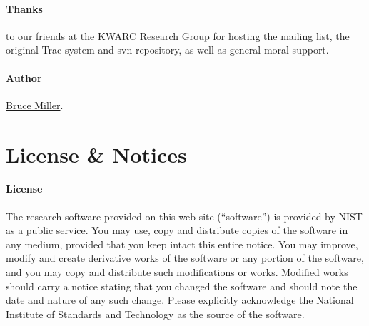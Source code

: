 \documentclass{article}
\begin{document}


\paragraph{Thanks} to our friends at
the \href{http://kwarc.info}{KWARC Research Group}
for hosting the mailing list, the original Trac system and svn repository,
as well as general moral support.


\paragraph{Author} \href{mailto:bruce.miller@nist.gov}{Bruce Miller}.
\section{License \& Notices}\label{notices}

\paragraph{License}
The research software provided on this web site (``software'') is
provided by NIST as a public service. You may use, copy and distribute
copies of the software in any medium, provided that you keep intact
this entire notice. You may improve, modify and create derivative
works of the software or any portion of the software, and you may copy
and distribute such modifications or works. Modified works should
carry a notice stating that you changed the software and should note
the date and nature of any such change. Please explicitly acknowledge
the National Institute of Standards and Technology as the source of
the software.
\end{document}
